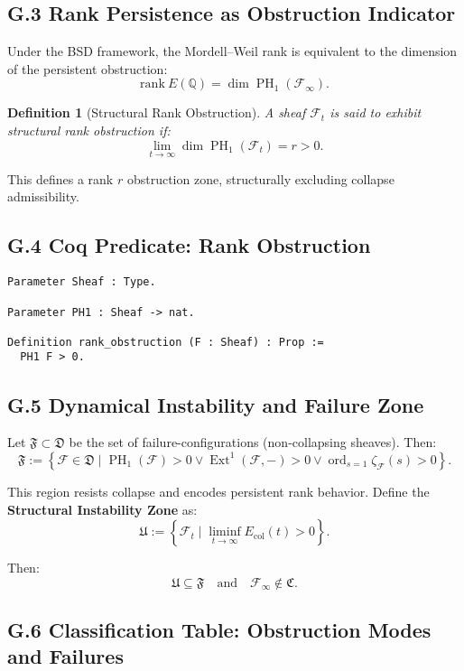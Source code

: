 \documentclass[11pt]{article}
\newtheorem{definition}[theorem]{Definition}
\DeclareMathOperator{\Ext}{Ext}
\DeclareMathOperator{\PH}{PH}
\newcommand{\ord}{\operatorname{ord}}
\begin{document}
\subsection*{G.3 Rank Persistence as Obstruction Indicator}

Under the BSD framework, the Mordell–Weil rank is equivalent to the dimension of the persistent obstruction:
\[
\mathrm{rank}~E(\mathbb{Q}) = \dim \PH_1(\mathcal{F}_\infty).
\]

\begin{definition}[Structural Rank Obstruction]
\label{def:rank-obstruction}
A sheaf \( \mathcal{F}_t \) is said to exhibit structural rank obstruction if:
\[
\lim_{t \to \infty} \dim \PH_1(\mathcal{F}_t) = r > 0.
\]
\end{definition}

This defines a rank \( r \) obstruction zone, structurally excluding collapse admissibility.

\subsection*{G.4 Coq Predicate: Rank Obstruction}
\begin{lstlisting}[language=Coq]
Parameter Sheaf : Type.

Parameter PH1 : Sheaf -> nat.

Definition rank_obstruction (F : Sheaf) : Prop :=
  PH1 F > 0.
\end{lstlisting}

\subsection*{G.5 Dynamical Instability and Failure Zone}

Let \( \mathfrak{F} \subset \mathfrak{D} \) be the set of failure-configurations (non-collapsing sheaves). Then:
\[
\mathfrak{F} := \left\{ \mathcal{F} \in \mathfrak{D} \mid \PH_1(\mathcal{F}) > 0 \lor \Ext^1(\mathcal{F}, -) > 0 \lor \ord_{s=1} \zeta_{\mathcal{F}}(s) > 0 \right\}.
\]

This region resists collapse and encodes persistent rank behavior.  
Define the \textbf{Structural Instability Zone} as:
\[
\mathfrak{U} := \left\{ \mathcal{F}_t \mid \liminf_{t \to \infty} E_{\mathrm{col}}(t) > 0 \right\}.
\]

Then:
\[
\mathfrak{U} \subseteq \mathfrak{F} \quad \text{and} \quad \mathcal{F}_\infty \notin \mathfrak{C}.
\]

\subsection*{G.6 Classification Table: Obstruction Modes and Failures}
\end{document}

